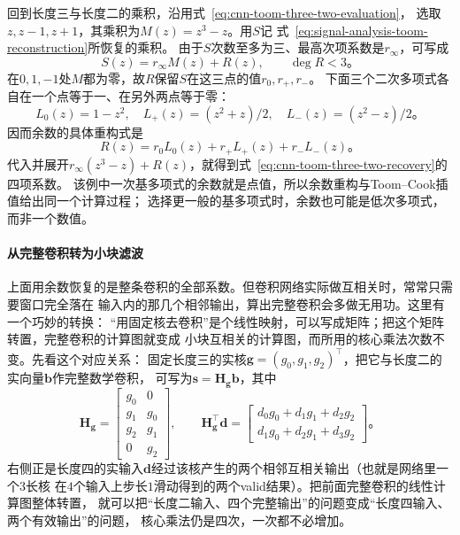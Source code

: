 回到长度三与长度二的乘积，沿用式~\eqref{eq:cnn-toom-three-two-evaluation}，
选取$z,z-1,z+1$，其乘积为$M(z)=z^3-z$。用$S$记
式~\eqref{eq:signal-analysis-toom-reconstruction}所恢复的乘积。
由于$S$次数至多为三、最高次项系数是$r_\infty$，可写成
\begin{equation}
  S(z)=r_\infty M(z)+R(z),\qquad \deg R<3\text{。}
  \label{eq:cnn-winograd-polynomial-remainder}
\end{equation}
在$0,1,-1$处$M$都为零，故$R$保留$S$在这三点的值$r_0,r_+,r_-$。
下面三个二次多项式各自在一个点等于一、在另外两点等于零：
\[
  L_0(z)=1-z^2,\quad
  L_+(z)=(z^2+z)/2,\quad
  L_-(z)=(z^2-z)/2\text{。}
\]
因而余数的具体重构式是
\begin{equation}
  R(z)=r_0L_0(z)+r_+L_+(z)+r_-L_-(z)\text{。}
  \label{eq:cnn-winograd-remainder-reconstruction}
\end{equation}
代入并展开$r_\infty(z^3-z)+R(z)$，就得到式~\eqref{eq:cnn-toom-three-two-recovery}的四项系数。
该例中一次基多项式的余数就是点值，所以余数重构与Toom--Cook插值给出同一个计算过程；
选择更一般的基多项式时，余数也可能是低次多项式，而非一个数值。

\paragraph{从完整卷积转为小块滤波}

上面用余数恢复的是整条卷积的全部系数。但卷积网络实际做互相关时，常常只需要窗口完全落在
输入内的那几个相邻输出，算出完整卷积会多做无用功。这里有一个巧妙的转换：
“用固定核去卷积”是个线性映射，可以写成矩阵；把这个矩阵转置，完整卷积的计算图就变成
小块互相关的计算图，而所用的核心乘法次数不变。先看这个对应关系：
固定长度三的实核$\bm g=(g_0,g_1,g_2)^\top$，把它与长度二的实向量$\bm b$作完整数学卷积，
可写为$\bm s=\bm H_{\bm g}\bm b$，其中
\begin{equation}
  \bm H_{\bm g}=\begin{bmatrix}
    g_0&0\\g_1&g_0\\g_2&g_1\\0&g_2
  \end{bmatrix},\qquad
  \bm H_{\bm g}^\top\bm d=
  \begin{bmatrix}
    d_0g_0+d_1g_1+d_2g_2\\
    d_1g_0+d_2g_1+d_3g_2
  \end{bmatrix}\text{。}
  \label{eq:cnn-winograd-filter-transposition}
\end{equation}
右侧正是长度四的实输入$\bm d$经过该核产生的两个相邻互相关输出（也就是网络里一个$3$长核
在$4$个输入上步长$1$滑动得到的两个valid结果）。把前面完整卷积的线性计算图整体转置，
就可以把“长度二输入、四个完整输出”的问题变成“长度四输入、两个有效输出”的问题，
核心乘法仍是四次，一次都不必增加。

